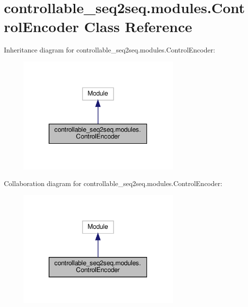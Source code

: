 \hypertarget{classcontrollable__seq2seq_1_1modules_1_1ControlEncoder}{}\section{controllable\+\_\+seq2seq.\+modules.\+Control\+Encoder Class Reference}
\label{classcontrollable__seq2seq_1_1modules_1_1ControlEncoder}


Inheritance diagram for controllable\+\_\+seq2seq.\+modules.\+Control\+Encoder\+:
\nopagebreak
\begin{figure}[H]
\begin{center}
\leavevmode
\includegraphics[width=231pt]{classcontrollable__seq2seq_1_1modules_1_1ControlEncoder__inherit__graph}
\end{center}
\end{figure}


Collaboration diagram for controllable\+\_\+seq2seq.\+modules.\+Control\+Encoder\+:
\nopagebreak
\begin{figure}[H]
\begin{center}
\leavevmode
\includegraphics[width=231pt]{classcontrollable__seq2seq_1_1modules_1_1ControlEncoder__coll__graph}
\end{center}
\end{figure}
